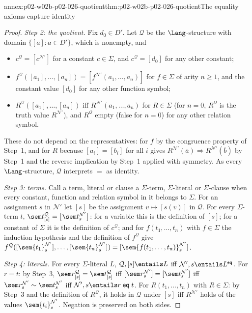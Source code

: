 \begin{annexitem}{annex:p02-w02b-p02-026-quotient}{thm:p02-w02b-p02-026-quotient}{The equality axioms capture identity}
\begin{proof}
\emph{Step 2: the quotient.}  Fix \(d_0\in D'\).  Let \(\mathcal Q\) be the
\(\Lang\)-structure with domain \(\{[a]:a\in D'\}\), which is nonempty, and
\begin{itemize}
  \item \(c^{\mathcal Q}=[c^{\mathcal N'}]\) for a constant \(c\in\Sigma\),
        and \(c^{\mathcal Q}=[d_0]\) for any other constant;
  \item \(f^{\mathcal Q}([a_1],\ldots,[a_n])=[f^{\mathcal N'}(a_1,\ldots,a_n)]\)
        for \(f\in\Sigma\) of arity \(n\geq1\), and the constant value
        \([d_0]\) for any other function symbol;
  \item \(R^{\mathcal Q}([a_1],\ldots,[a_n])\) iff
        \(R^{\mathcal N'}(a_1,\ldots,a_n)\) for \(R\in\Sigma\) (for \(n=0\),
        \(R^{\mathcal Q}\) is the truth value \(R^{\mathcal N'}\)), and
        \(R^{\mathcal Q}\) empty (false for \(n=0\)) for any other relation
        symbol.
\end{itemize}
These do not depend on the representatives: for \(f\) by the congruence
property of Step~1, and for \(R\) because \([a_i]=[b_i]\) for all \(i\) gives
\(R^{\mathcal N'}(\bar a)\Rightarrow R^{\mathcal N'}(\bar b)\) by Step~1 and
the reverse implication by Step~1 applied with symmetry.  As every
\(\Lang\)-structure, \(\mathcal Q\) interprets \(=\) as identity.

\emph{Step 3: terms.}  Call a term, literal or clause a \(\Sigma\)-term,
\(\Sigma\)-literal or \(\Sigma\)-clause when every constant, function and
relation symbol in it belongs to \(\Sigma\).  For an assignment \(s\) in
\(\mathcal N'\) let \([s]\) be the assignment \(v\mapsto[s(v)]\) in
\(\mathcal Q\).  For every \(\Sigma\)-term \(t\),
\(\sem t^{\mathcal Q}_{[s]}=\bigl[\sem t^{\mathcal N'}_s\bigr]\): for a
variable this is the definition of \([s]\); for a constant of \(\Sigma\) it is
the definition of \(c^{\mathcal Q}\); and for \(f(t_1,\ldots,t_n)\) with
\(f\in\Sigma\) the induction hypothesis and the definition of
\(f^{\mathcal Q}\) give
\(f^{\mathcal Q}([\sem{t_1}^{\mathcal N'}_s],\ldots,[\sem{t_n}^{\mathcal N'}_s])
=[\sem{f(t_1,\ldots,t_n)}^{\mathcal N'}_s]\).

\emph{Step 4: literals.}  For every \(\Sigma\)-literal \(L\),
\(\mathcal Q,[s]\entails L\) iff \(\mathcal N',s\entails L^{\mathsf{eq}}\).
For \(r=t\): by Step~3, \(\sem r^{\mathcal Q}_{[s]}=\sem t^{\mathcal Q}_{[s]}\)
iff \([\sem r^{\mathcal N'}_s]=[\sem t^{\mathcal N'}_s]\) iff
\(\sem r^{\mathcal N'}_s\sim\sem t^{\mathcal N'}_s\) iff
\(\mathcal N',s\entails r\mathrel{\mathsf{eq}}t\).  For \(R(t_1,\ldots,t_n)\)
with \(R\in\Sigma\): by Step~3 and the definition of \(R^{\mathcal Q}\), it
holds in \(\mathcal Q\) under \([s]\) iff \(R^{\mathcal N'}\) holds of the
values \(\sem{t_i}^{\mathcal N'}_s\).  Negation is preserved on both sides.


\end{proof}
\end{annexitem}
